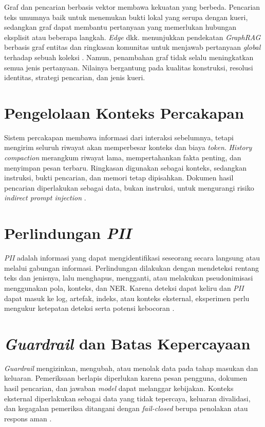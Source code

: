 Graf dan pencarian berbasis vektor membawa kekuatan yang berbeda. Pencarian teks umumnya baik untuk menemukan bukti lokal yang serupa dengan kueri, sedangkan graf dapat membantu pertanyaan yang memerlukan hubungan eksplisit atau beberapa langkah. \emph{Edge} dkk. menunjukkan pendekatan \emph{GraphRAG} berbasis graf entitas dan ringkasan komunitas untuk menjawab pertanyaan \emph{global} terhadap sebuah koleksi \parencite{edgeFromLocalGlobalGraph2024}. Namun, penambahan graf tidak selalu meningkatkan semua jenis pertanyaan. Nilainya bergantung pada kualitas konstruksi, resolusi identitas, strategi pencarian, dan jenis kueri.

\section{Pengelolaan Konteks Percakapan}

Sistem percakapan membawa informasi dari interaksi sebelumnya, tetapi mengirim seluruh riwayat
akan memperbesar konteks dan biaya \emph{token}. \emph{History compaction} merangkum riwayat lama,
mempertahankan fakta penting, dan menyimpan pesan terbaru. Ringkasan digunakan sebagai konteks,
sedangkan instruksi, bukti pencarian, dan memori tetap dipisahkan. Dokumen hasil pencarian
diperlakukan sebagai data, bukan instruksi, untuk mengurangi risiko \emph{indirect prompt injection}
\parencite{wuLongMemEval2025,greshakeIndirectPromptInjection2023}.

\section{Perlindungan \emph{PII}}

\emph{PII} adalah informasi yang dapat mengidentifikasi seseorang secara langsung atau melalui gabungan
informasi. Perlindungan dilakukan dengan mendeteksi rentang teks dan jenisnya, lalu menghapus,
mengganti, atau melakukan pseudonimisasi menggunakan pola, konteks, dan NER. Karena deteksi dapat
keliru dan \emph{PII} dapat masuk ke log, artefak, indeks, atau konteks eksternal, eksperimen perlu mengukur
ketepatan deteksi serta potensi kebocoran \parencite{mccallisterGuideProtectingPII2010,
microsoftDataProtectionDeidentification2025}.

\section{\emph{Guardrail} dan Batas Kepercayaan}

\emph{Guardrail} mengizinkan, mengubah, atau menolak data pada tahap masukan dan keluaran.
Pemeriksaan berlapis diperlukan karena pesan pengguna, dokumen hasil pencarian, dan jawaban \emph{model}
dapat melanggar kebijakan. Konteks eksternal diperlakukan sebagai data yang tidak tepercaya,
keluaran divalidasi, dan kegagalan pemeriksa ditangani dengan \emph{fail-closed} berupa penolakan
atau respons aman \parencite{nvidiaNeMoGuardrailsCatalog2025,liangSafeRAG2025,zouPoisonedRAG2025}.

